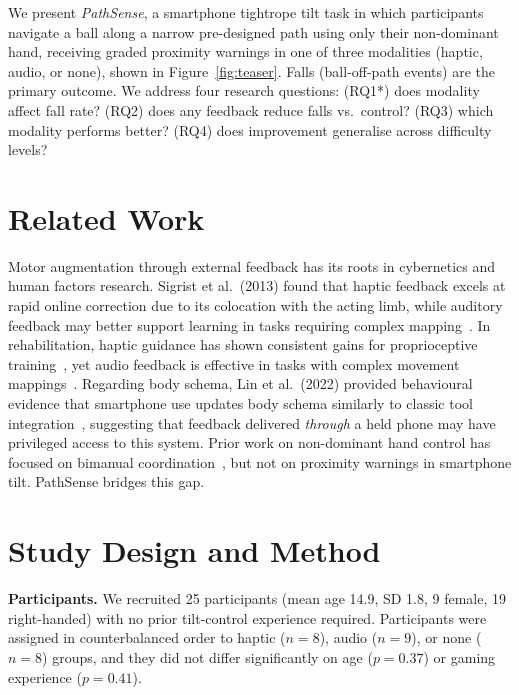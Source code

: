\documentclass[sigconf]{acmart}
\begin{document}
We present \emph{PathSense}, a smartphone tightrope tilt task in which participants navigate a ball along a narrow pre-designed path using only their non-dominant hand, receiving graded proximity warnings in one of three modalities (haptic, audio, or none), shown in Figure~\ref{fig:teaser}.
Falls (ball-off-path events) are the primary outcome.
We address four research questions: (RQ1*) does modality affect fall rate? (RQ2) does any feedback reduce falls vs.\ control? (RQ3) which modality performs better? (RQ4) does improvement generalise across difficulty levels?

\section{Related Work}

Motor augmentation through external feedback has its roots in cybernetics and human factors research.
Sigrist et al.\ (2013) found that haptic feedback excels at rapid online correction due to its colocation with the acting limb, while auditory feedback may better support learning in tasks requiring complex mapping~\cite{augmented_sigrist_2013}.
In rehabilitation, haptic guidance has shown consistent gains for proprioceptive training~\cite{robotassisted_cuppone_2016}, yet audio feedback is effective in tasks with complex movement mappings~\cite{augmented_sigrist_2013}.
Regarding body schema, Lin et al.\ (2022) provided behavioural evidence that smartphone use updates body schema similarly to classic tool integration~\cite{smartphone_lin_2022}, suggesting that feedback delivered \emph{through} a held phone may have privileged access to this system.
Prior work on non-dominant hand control has focused on bimanual coordination~\cite{asymmetric_guiard_1987}, but not on proximity warnings in smartphone tilt. PathSense bridges this gap.

\section{Study Design and Method}

\textbf{Participants.}
We recruited 25 participants (mean age 14.9, SD 1.8, 9 female, 19 right-handed) with no prior tilt-control experience required.
Participants were assigned in counterbalanced order to haptic ($n=8$), audio ($n=9$), or none ($n=8$) groups, and they did not differ significantly on age ($p = 0.37$) or gaming experience ($p = 0.41$).
\end{document}
